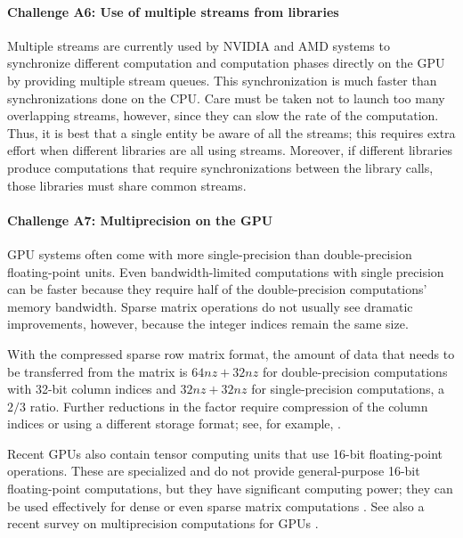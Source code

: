 \documentclass[10pt,journal,compsoc]{IEEEtran}
\begin{document}
\paragraph{Challenge A6: Use of multiple streams from libraries}
Multiple streams are currently used by NVIDIA and AMD systems to synchronize different computation and computation phases directly on the GPU by providing multiple stream queues.
This synchronization
is much faster than synchronizations done on the CPU.
Care must be taken not to launch too many overlapping streams, however, since  they can slow the rate of the
computation. Thus,  it is best that a single entity be aware of all the streams; this requires extra effort when different libraries are all using streams.
Moreover, if different libraries produce computations that require synchronizations between the library calls, those libraries must share common streams.




\paragraph{Challenge A7: Multiprecision on the GPU}
GPU systems often come with more single-precision than
double-precision floating-point units. Even bandwidth-limited computations with single precision can be faster because they
require half of the double-precision computations' memory bandwidth. 
Sparse matrix operations do not usually see dramatic improvements, however, because the
integer indices remain the same size.

With the compressed sparse row matrix format, the amount of data that needs to be
transferred from the matrix is $ 64 nz + 32 nz$ for double-precision
computations with 32-bit column indices and $ 32 nz + 32 nz$ for single-precision computations, a $ 2/3 $ ratio. Further reductions in the factor
require compression of the column indices or 
using a different storage format; see, for example, \cite{filippone2017GPGPUSpMV}.

Recent GPUs also contain tensor computing units that use 16-bit floating-point operations. These are specialized and do not provide general-purpose 16-bit
floating-point computations, but they have significant computing power; they can be used effectively for dense \cite{haidar2018harnessing} or even sparse matrix computations \cite{zachariadis2020accelerating}. See
also a recent survey on multiprecision computations for GPUs \cite{blanchard2020mixed}. 
\end{document}
